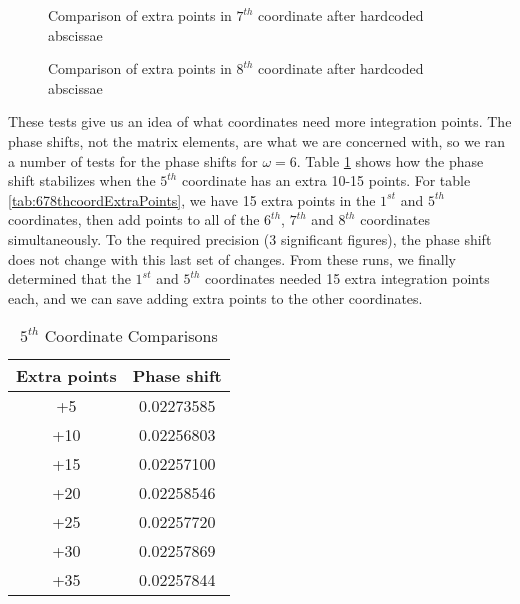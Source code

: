 \documentclass[Dissertation.tex]{subfiles}
\begin{document}
\begin{figure}
\centering
{}
\caption{Comparison of extra points in $7^{th}$ coordinate after hardcoded abscissae}
\label{fig:PlusCoord7}
\end{figure}

\begin{figure}
\centering
{}
\caption{Comparison of extra points in $8^{th}$ coordinate after hardcoded abscissae}
\label{fig:PlusCoord8}
\end{figure}

These tests give us an idea of what coordinates need more integration points. The phase shifts, not the matrix elements, are what we are concerned with, so we ran a number of tests for the phase shifts for $\omega = 6$. Table \ref{tab:5thcoordExtraPoints} shows how the phase shift stabilizes when the $5^{th}$ coordinate has an extra 10-15 points. For table \ref{tab:678thcoordExtraPoints}, we have 15 extra points in the $1^{st}$ and $5^{th}$ coordinates, then add points to all of the $6^{th}$, $7^{th}$ and $8^{th}$ coordinates simultaneously. To the required precision (3 significant figures), the phase shift does not change with this last set of changes. From these runs, we finally determined that the $1^{st}$ and $5^{th}$ coordinates needed 15 extra integration points each, and we can save adding extra points to the other coordinates.

\begin{table}
\centering
\begin{tabular}{c c}
\toprule
Extra points & Phase shift \\
\midrule
+5 & 0.02273585 \\
+10 & 0.02256803 \\
+15 & 0.02257100 \\
+20 & 0.02258546 \\
+25 & 0.02257720 \\
+30 & 0.02257869 \\
+35 & 0.02257844 \\
\bottomrule
\end{tabular}
\caption{$5^{th}$ Coordinate Comparisons}
\label{tab:5thcoordExtraPoints}
\end{table}
\end{document}
